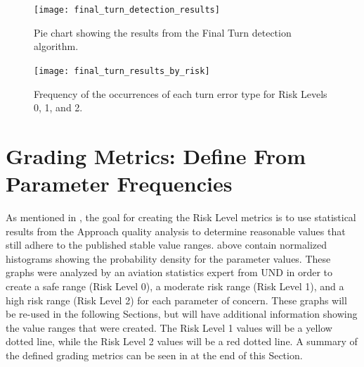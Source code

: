             \begin{figure}
            	\centering
                \texttt{[image: final\_turn\_detection\_results]}
                \caption{Pie chart showing the results from the Final Turn detection algorithm.}
                \label{fig:final_turn_results_ratios}
            \end{figure}
            
            \begin{figure}
            	\centering
                \texttt{[image: final\_turn\_results\_by\_risk]}
                \caption{Frequency of the occurrences of each turn error type for Risk Levels 0, 1, and 2.}
                \label{fig:final_turn_results_by_risk}
            \end{figure}
            
        
        


\section{Grading Metrics:  Define From Parameter Frequencies}

	As mentioned in , the goal for creating the Risk Level metrics is to use statistical results from the Approach quality analysis to determine reasonable values that still adhere to the published stable value ranges.   above contain normalized histograms showing the probability density for the parameter values.  These graphs were analyzed by an aviation statistics expert from UND in order to create a safe range (Risk Level 0), a moderate risk range (Risk Level 1), and a high risk range (Risk Level 2) for each parameter of concern.  These graphs will be re-used in the following Sections, but will have additional information showing the value ranges that were created.  The Risk Level 1 values will be a yellow dotted line, while the Risk Level 2 values will be a red dotted line.  A summary of the defined grading metrics can be seen in  at the end of this Section.


